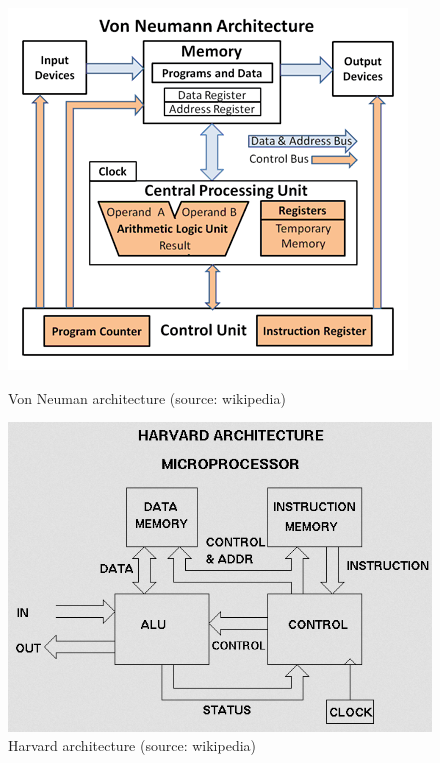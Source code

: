 \begin{figure}[!htb]
  \includegraphics[width=\linewidth]{von_neuman}
  \caption{Von Neuman architecture (source: wikipedia)}
\endminipage\hfill
{}
  \includegraphics[width=\linewidth]{harvard_arch}
  \caption{Harvard architecture (source: wikipedia)}
\endminipage\hfill
\end{figure}


